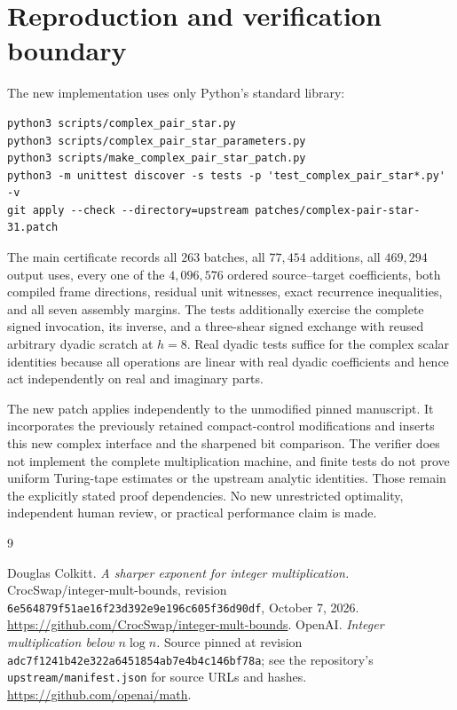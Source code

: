 \documentclass[11pt]{article}
\begin{document}
\section{Reproduction and verification boundary}
The new implementation uses only Python's standard library:
\begin{verbatim}
python3 scripts/complex_pair_star.py
python3 scripts/complex_pair_star_parameters.py
python3 scripts/make_complex_pair_star_patch.py
python3 -m unittest discover -s tests -p 'test_complex_pair_star*.py' -v
git apply --check --directory=upstream patches/complex-pair-star-31.patch
\end{verbatim}
The main certificate records all $263$ batches, all $77{,}454$ additions,
all $469{,}294$ output uses, every one of the $4{,}096{,}576$ ordered
source--target coefficients, both compiled frame directions, residual unit
witnesses, exact recurrence inequalities, and all seven assembly margins.
The tests additionally exercise the complete signed invocation, its inverse,
and a three-shear signed exchange with reused arbitrary dyadic scratch at
$h=8$.  Real dyadic tests suffice for the complex scalar identities because
all operations are linear with real dyadic coefficients and hence act
independently on real and imaginary parts.

The new patch applies independently to the unmodified pinned manuscript.
It incorporates the previously retained compact-control modifications and
inserts this new complex interface and the sharpened bit comparison.
The verifier does not implement the complete multiplication machine, and
finite tests do not prove uniform Turing-tape estimates or the upstream
analytic identities.  Those remain the explicitly stated proof dependencies.
No new unrestricted optimality, independent human review, or practical
performance claim is made.

\begin{thebibliography}{9}
\raggedright
{} Douglas Colkitt.
\emph{A sharper exponent for integer multiplication.}
CrocSwap/integer-mult-bounds, revision
\texttt{6e564879f51ae16f23d392e9e196c605f36d90df}, October 7, 2026.
\url{https://github.com/CrocSwap/integer-mult-bounds}.
 OpenAI.
\emph{Integer multiplication below $n\log n$.}
Source pinned at revision
\texttt{adc7f1241b42e322a6451854ab7e4b4c146bf78a}; see the repository's
\texttt{upstream/manifest.json} for source URLs and hashes.
\url{https://github.com/openai/math}.
\end{thebibliography}
\end{document}

